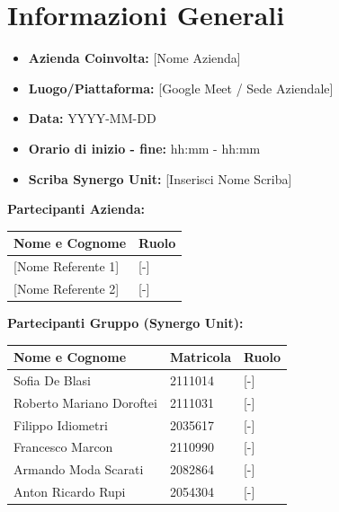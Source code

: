 \section{Informazioni Generali}
\begin{itemize}
	\item \textbf{Azienda Coinvolta:} {[Nome Azienda]}
	\item \textbf{Luogo/Piattaforma:} {[Google Meet / Sede Aziendale]}
	\item \textbf{Data:} YYYY-MM-DD
	\item \textbf{Orario di inizio - fine:} hh:mm - hh:mm
	\item \textbf{Scriba Synergo Unit:} {[Inserisci Nome Scriba]}
\end{itemize}

\vspace{0.5cm}
\textbf{Partecipanti Azienda:}
\begin{table}[ht]
	\centering
	\renewcommand{\arraystretch}{1.2}
	\begin{tabularx}{\textwidth}{X l}
		\toprule
		\textbf{Nome e Cognome} & \textbf{Ruolo} \\
		\midrule
		{[Nome Referente 1]} & {[-]} \\
		{[Nome Referente 2]} & {[-]} \\
		\bottomrule
	\end{tabularx}
\end{table}

\vspace{0.5cm}
\textbf{Partecipanti Gruppo (Synergo Unit):}
\begin{table}[ht]
	\centering
	\renewcommand{\arraystretch}{1.2}
	\begin{tabularx}{\textwidth}{X l l}
		\toprule
		\textbf{Nome e Cognome} & \textbf{Matricola} & \textbf{Ruolo} \\
		\midrule
		Sofia De Blasi & 2111014 & {[-]} \\
		Roberto Mariano Doroftei & 2111031 & {[-]} \\
		Filippo Idiometri & 2035617 & {[-]} \\
		Francesco Marcon & 2110990 & {[-]} \\
		Armando Moda Scarati & 2082864 & {[-]} \\
		Anton Ricardo Rupi & 2054304 & {[-]} \\
		\bottomrule
	\end{tabularx}
\end{table}

